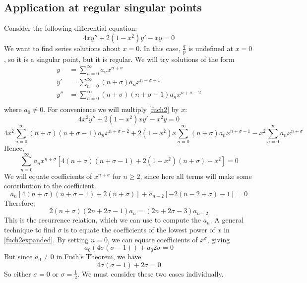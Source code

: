 \subsection{Application at regular singular points}
Consider the following differential equation:
\begin{equation}\label{fuch2}
	4xy'' + 2(1-x^2)y' - xy = 0
\end{equation}
We want to find series solutions about \(x=0\).
In this case, \(\frac{q}{p}\) is undefined at \(x=0\), so it is a singular point, but it is regular.
We will try solutions of the form
\begin{align*}
	y   & = \sum_{n=0}^\infty a_n x^{n + \sigma}                         \\
	y'  & = \sum_{n=0}^\infty (n+\sigma)a_n x^{n + \sigma-1}             \\
	y'' & = \sum_{n=0}^\infty (n+\sigma)(n+\sigma-1)a_n x^{n + \sigma-2} \\
\end{align*}
where \(a_0 \neq 0\).
For convenience we will multiply \eqref{fuch2} by \(x\):
\[
	4x^2y'' + 2(1-x^2)xy' - x^2y = 0
\]
\[
	4x^2\sum_{n=0}^\infty (n+\sigma)(n+\sigma-1)a_n x^{n + \sigma-2} + 2(1-x^2)x\sum_{n=0}^\infty (n+\sigma)a_n x^{n + \sigma-1} - x^2\sum_{n=0}^\infty a_n x^{n + \sigma}
\]
Hence,
\begin{equation}\label{fuch2expanded}
	\sum_{n=0}^\infty a_n x^{n + \sigma}\left[4(n+\sigma)(n+\sigma-1) + 2\left(1-x^2\right)(n+\sigma) - x^2\right] = 0
\end{equation}
We will equate coefficients of \(x^{n+\sigma}\) for \(n\geq 2\), since here all terms will make some contribution to the coefficient.
\[
	a_n\left[4(n+\sigma)(n+\sigma-1) + 2(n+\sigma)\right] + a_{n-2}\left[-2(n-2+\sigma) - 1\right] = 0
\]
Therefore,
\begin{equation}\label{fuch2recurrence}
	2(n+\sigma)(2n+2\sigma-1)a_n = (2n+2\sigma-3)a_{n-2}
\end{equation}
This is the recurrence relation, which we can use to compute the \(a_n\).
A general technique to find \(\sigma\) is to equate the coefficients of the lowest power of \(x\) in \eqref{fuch2expanded}.
By setting \(n=0\), we can equate coefficients of \(x^\sigma\), giving
\[
	a_0(4\sigma(\sigma - 1)) + a_0 2\sigma = 0
\]
But since \(a_0 \neq 0\) in Fuch's Theorem, we have
\[
	4\sigma(\sigma - 1) + 2\sigma = 0
\]
So either \(\sigma = 0\) or \(\sigma = \frac{1}{2}\).
We must consider these two cases individually.
